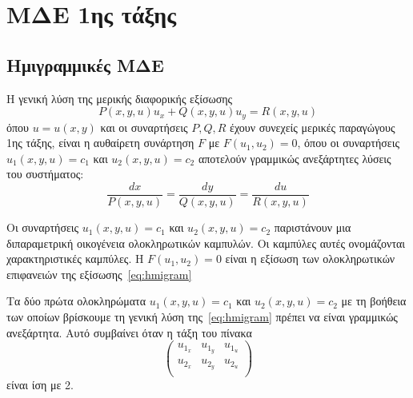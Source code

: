 



\everymath{\displaystyle}
\thispagestyle{askhseis}




\chapter{ΜΔΕ 1ης τάξης}

\section{Ημιγραμμικές ΜΔΕ}

\begin{thm}
  Η γενική λύση της μερικής διαφορικής εξίσωσης 
  \begin{equation} \label{eq:hmigram}
    P(x,y,u)u_{x} + Q(x,y,u)u_{y} = R(x,y,u) 
  \end{equation} 
  όπου $ u=u(x,y) $ και οι συναρτήσεις $ P,Q,R $ έχουν συνεχείς μερικές παραγώγους 
  1ης τάξης, είναι η αυθαίρετη συνάρτηση $ F $ με $ F(u_{1},u_{2})=0 $, όπου οι 
  συναρτήσεις $ u_{1}(x,y,u)= c_{1} $ και $ u_{2}(x,y,u)= c_{2} $ αποτελούν γραμμικώς 
  ανεξάρτητες λύσεις του συστήματος:
  \begin{equation} \label{eq:systhm}
    \frac{dx}{P(x,y,u)} = \frac{dy}{Q(x,y,u)} = \frac{du}{R(x,y,u)} 
  \end{equation}
\end{thm}

\begin{rem}
  Οι συναρτήσεις $ u_{1}(x,y,u)= c_{1} $ και $ u_{2}(x,y,u)= c_{2} $ παριστάνουν μια 
  διπαραμετρική οικογένεια ολοκληρωτικών καμπυλών. Οι καμπύλες αυτές ονομάζονται 
  χαρακτηριστικές καμπύλες. Η $ F(u_{1},u_{2})=0 $ είναι η εξίσωση των ολοκληρωτικών 
  επιφανειών της εξίσωσης~\eqref{eq:hmigram}
\end{rem}

\begin{rem}
  Τα δύο πρώτα ολοκληρώματα $ u_{1}(x,y,u)= c_{1} $ και $ u_{2}(x,y,u)= c_{2} $ με 
  τη βοήθεια των οποίων βρίσκουμε τη γενική λύση της~\eqref{eq:hmigram} πρέπει να 
  είναι γραμμικώς ανεξάρτητα. Αυτό συμβαίνει όταν η τάξη του πίνακα 
  \[
    \begin{pmatrix}
      u_{{1}_{x}} & u_{{1}_{y}} & u_{{1}_{u}} \\
      u_{{2}_{x}} & u_{{2}_{y}} & u_{{2}_{u}} \\
    \end{pmatrix}
  \]
  είναι ίση με 2.
\end{rem}

